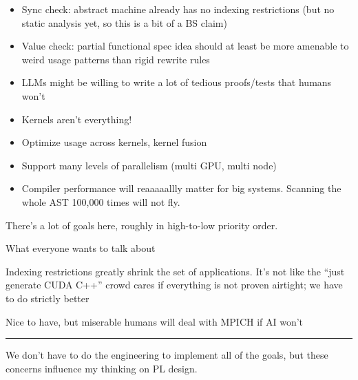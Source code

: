 \newpage
{}

{\LARGE



\begin{itemize}
  \item Sync check: abstract machine already has no indexing restrictions
  (but no static analysis yet, so this is a bit of a BS claim)
  \item Value check: partial functional spec idea should at least be more amenable to weird usage patterns than rigid rewrite rules
  \item LLMs might be willing to write a lot of tedious proofs/tests that humans won't
\end{itemize}


}

\newpage
{}

{\LARGE




\begin{itemize}
  \item Kernels aren't everything!
  \item Optimize usage across kernels, kernel fusion
  \item Support many levels of parallelism (multi GPU, multi node)
  \item Compiler performance will reaaaaallly matter for big systems. Scanning the whole AST 100,000 times will not fly.
\end{itemize}

}

\newpage
{}

{\LARGE

There's a lot of goals here, roughly in high-to-low priority order.


What everyone wants to talk about


Indexing restrictions greatly shrink the set of applications.
It's not like the ``just generate CUDA C++'' crowd cares if everything is not proven airtight; we have to do strictly better


Nice to have, but miserable humans will deal with MPICH if AI won't

\vfill

\hrule

\vfill

We don't have to do the engineering to implement all of the goals, but these concerns influence my thinking on PL design.

}


